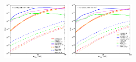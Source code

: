 \documentclass[aps,prd,amsmath,amssymb,showpacs,floats,floatfix,nofootinbib,reprint]{revtex4-1}
\begin{document}
\begin{figure}[!htbp]
{\includegraphics[width=0.3\textwidth]{comparison_urmajor2-hawc.eps}}
{\includegraphics[width=0.3\textwidth]{comparison_urminor-hawc.eps}}
\end{figure}
\end{document}
